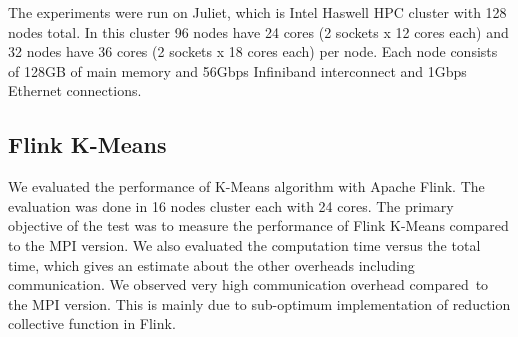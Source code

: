 \documentclass[10pt, conference, compsocconf]{IEEEtran}
\begin{document}




The experiments were run on Juliet, which is Intel Haswell HPC cluster with 128 nodes total. In this cluster 96 nodes have 24 cores (2 sockets x 12 cores each) and 32 nodes have 36 cores (2 sockets x 18 cores each) per node. Each node consists of 128GB of main memory and 56Gbps Infiniband interconnect and 1Gbps Ethernet connections. 


\subsection{Flink K-Means}
We evaluated the performance of K-Means algorithm with Apache Flink. The evaluation was done in 16 nodes cluster each with 24 cores. The primary objective of the test was to measure the performance of Flink K-Means compared to the MPI version. We also evaluated the computation time versus the total time, which gives an estimate about the other overheads including communication. We observed very high communication overhead compared to the MPI version. This is mainly due to sub-optimum implementation of reduction collective function in Flink.
\end{document}
